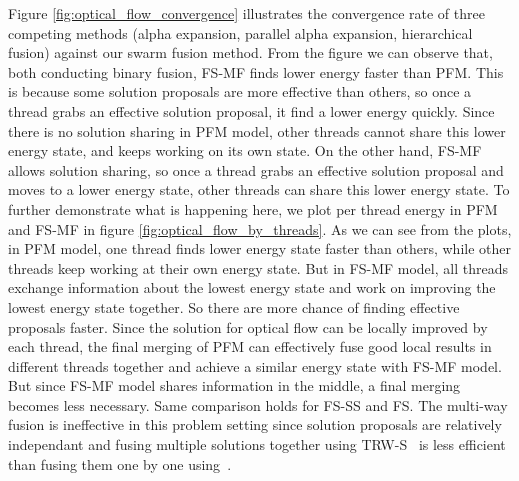 Figure \ref{fig:optical_flow_convergence} illustrates the convergence rate of three competing methods (alpha expansion, parallel alpha expansion, hierarchical fusion) against
our swarm fusion method. From the figure we can observe that, both conducting binary fusion, FS-MF finds lower energy faster than PFM. This is because some solution proposals are more effective than others, so once a thread grabs an effective solution proposal, it find a lower energy quickly. Since there is no solution sharing in PFM model, other threads cannot share this lower energy state, and keeps working on its own state. On the other hand, FS-MF allows solution sharing, so once a thread grabs an effective solution proposal and moves to a lower energy state, other threads can share this lower energy state. To further demonstrate what is happening here, we plot per thread energy in PFM and FS-MF in figure \ref{fig:optical_flow_by_threads}. As we can see from the plots, in PFM model, one thread finds lower energy state faster than others, while other threads keep working at their own energy state. But in FS-MF model, all threads exchange information about the lowest energy state and work on improving the lowest energy state together. So there are more chance of finding effective proposals faster. Since the solution for optical flow can be locally improved by each thread, the final merging of PFM can effectively fuse good local results in different threads together and achieve a similar energy state with FS-MF model. But since FS-MF model shares information in the middle, a final merging becomes less necessary. Same comparison holds for FS-SS and FS. The multi-way fusion is ineffective in this problem setting since solution proposals are relatively independant and fusing multiple solutions together using TRW-S~\cite{TRW-S} is less efficient than fusing them one by one using~\cite{QPBO}.

